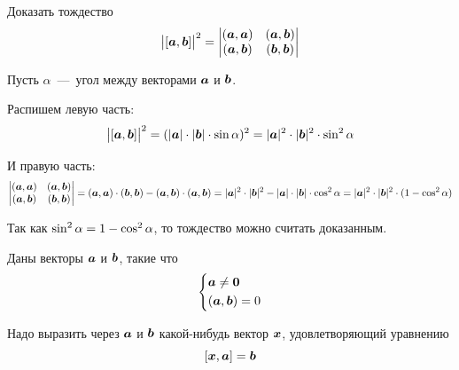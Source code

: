 \documentclass[a4paper,12pt]{article}
\begin{document}
  
  \begin{problem}[3.13(1)]
    Доказать тождество
    \[
      \bigl| [\boldsymbol a, \boldsymbol b] \bigr|^2 = \begin{vmatrix}
        (\boldsymbol a, \boldsymbol a) & (\boldsymbol a, \boldsymbol b)\\
        (\boldsymbol a, \boldsymbol b) & (\boldsymbol b, \boldsymbol b)
      \end{vmatrix}
    \]
  \end{problem}
  
  \begin{solution}
    Пусть $\alpha$~---~угол между векторами $\boldsymbol a$ и $\boldsymbol b$.
    
    Распишем левую часть:
    \[
      \bigl| [\boldsymbol a, \boldsymbol b] \bigr|^2
      = (|\boldsymbol a| \cdot |\boldsymbol b| \cdot \sin\alpha)^2
      = |\boldsymbol a|^2 \cdot |\boldsymbol b|^2 \cdot \sin^2\alpha
    \]
    
    И правую часть:
    \[
      \begin{vmatrix}
        (\boldsymbol a, \boldsymbol a) & (\boldsymbol a, \boldsymbol b)\\
        (\boldsymbol a, \boldsymbol b) & (\boldsymbol b, \boldsymbol b)
      \end{vmatrix}
      = (\boldsymbol a, \boldsymbol a) \cdot (\boldsymbol b, \boldsymbol b) - (\boldsymbol a, \boldsymbol b) \cdot (\boldsymbol a, \boldsymbol b)
      = |\boldsymbol a|^2 \cdot |\boldsymbol b|^2 - |\boldsymbol a| \cdot |\boldsymbol b| \cdot \cos^2\alpha
      = |\boldsymbol a|^2 \cdot |\boldsymbol b|^2 \cdot (1 - \cos^2\alpha)
    \]
    
    Так как $\sin^2\alpha \hm= 1 \hm- \cos^2\alpha$, то тождество можно считать доказанным.
  \end{solution}
  
  
  \begin{problem}[3.15 (близкая к 3.16)]
    Даны векторы $\boldsymbol a$ и $\boldsymbol b$, такие что
    \[
      \left\{
        \begin{aligned}
          &\boldsymbol a \not= \boldsymbol 0\\
          &(\boldsymbol a, \boldsymbol b) = 0
        \end{aligned}
      \right.
    \]
    
    Надо выразить через $\boldsymbol a$ и $\boldsymbol b$ какой-нибудь вектор $\boldsymbol x$, удовлетворяющий уравнению
    \[
      [\boldsymbol x, \boldsymbol a] = \boldsymbol b
    \]
  \end{problem}
  
\end{document}
